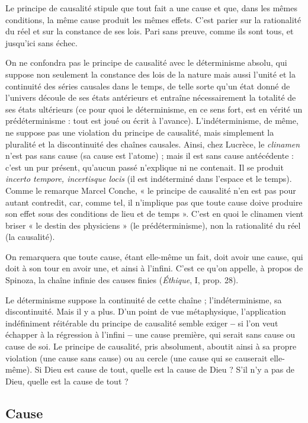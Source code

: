 Le principe de causalité stipule que tout
fait a une cause et que, dans les mêmes
conditions, la même cause produit les mêmes effets. C’est parier sur la rationalité
du réel et sur la constance de ses lois. Pari sans preuve, comme ils sont tous,
et jusqu'ici sans échec.

On ne confondra pas le principe de causalité avec le déterminisme absolu,
qui suppose non seulement la constance des lois de la nature mais aussi l’unité
et la continuité des séries causales dans le temps, de telle sorte qu’un état donné
de l'univers découle de ses états antérieurs et entraîne nécessairement la totalité
de ses états ultérieurs (ce pour quoi le déterminisme, en ce sens fort, est en
vérité un prédéterminisme : tout est joué ou écrit à l'avance). L’indéterminisme,
de même, ne suppose pas une violation du principe de causalité, mais
simplement la pluralité et la discontinuité des chaînes causales. Ainsi, chez
Lucrèce, le {\it clinamen} n’est pas sans cause (sa cause est l’atome) ; mais il est sans
cause antécédente : c’est un pur présent, qu'aucun passé n’explique ni ne contenait.
Il se produit {\it incerto tempore, incertisque locis} (il est indéterminé dans
l’espace et le temps). Comme le remarque Marcel Conche, « le principe de causalité
n’en est pas pour autant contredit, car, comme tel, il n’implique pas que
toute cause doive produire son effet sous des conditions de lieu et de temps ».
C’est en quoi le clinamen vient briser « le destin des physiciens » (le prédéterminisme),
non la rationalité du réel (la causalité).

On remarquera que toute cause, étant elle-même un fait, doit avoir une
cause, qui doit à son tour en avoir une, et ainsi à l’infini. C’est ce qu’on appelle,
à propos de Spinoza, la chaîne infinie des causes finies ({\it Éthique}, I, prop. 28).

Le déterminisme suppose la continuité de cette chaîne ; l’indéterminisme, sa
discontinuité. Mais il y a plus. D’un point de vue métaphysique, l’application
indéfiniment réitérable du principe de causalité semble exiger {\bf --} si l’on veut
échapper à la régression à l’infini {\bf --} une cause première, qui serait sans cause ou
cause de soi. Le principe de causalité, pris absolument, aboutit ainsi à sa propre
violation (une cause sans cause) ou au cercle (une cause qui se causerait elle-même).
Si Dieu est cause de tout, quelle est la cause de Dieu ? S’il n’y a pas de
Dieu, quelle est la cause de tout ?

\subsection{Cause}

